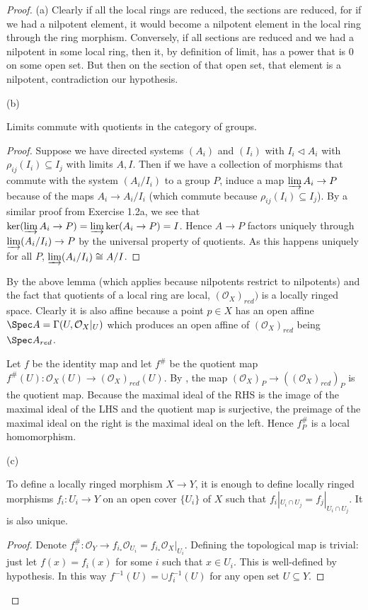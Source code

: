 \begin{proof}
	(a) Clearly if all the local rings are reduced, the sections are reduced, for if we had a nilpotent element, it would become a nilpotent element in the local ring through the ring morphism.
	Conversely, if all sections are reduced and we had a nilpotent in some local ring, then it, by definition of limit, has a power that is $0$ on some open set.
	But then on the section of that open set, that element is a nilpotent, contradiction our hypothesis.

	(b)
	\begin{lem}\label{lem:limquotient}
		Limits commute with quotients in the category of groups.
	\end{lem}
	\begin{proof}
		Suppose we have directed systems $(A_i) $ and $(I_i) $ with $I_i \triangleleft A_i$ with $\rho_{ij}(I_i) \subseteq I_j $ with limits $A, I $.
		Then if we have a collection of morphisms that commute with the system $(A_i / I_i)$ to a group $P $, induce a map $\varinjlim A_i \to P $ because of the maps $A_i \to A_i / I_i $ (which commute because $\rho_{ij}(I_i) \subseteq I_j $).
		By a similar proof from Exercise 1.2a, we see that $\ker(\varinjlim A_i \to P) = \varinjlim \ker (A_i \to P) = I$.
		Hence $A \to P $ factors uniquely through $\varinjlim (A_i /I_i) \to P $ by the universal property of quotients.
		As this happens uniquely for all $P $, $\varinjlim (A_i /I_i) \cong A / I $.
	\end{proof}

	By the above lemma (which applies because nilpotents restrict to nilpotents) and the fact that quotients of a local ring are local, $(\mathcal{O}_X)_{red}) $ is a locally ringed space.
	Clearly it is also affine because a point $p \in X $ has an open affine $\Spec A = \Gamma(U, \mathcal{O}_X|_U)$ which produces an open affine of $(\mathcal{O}_X)_{red} $ being $\Spec A_{red} $.

	Let $f $ be the identity map and let $f^\# $ be the quotient map $f^\#(U): \mathcal{O}_X(U) \to (\mathcal{O}_X)_{red}(U) $.
	By , the map $(\mathcal{O}_X)_P \to ((\mathcal{O}_X)_{red})_P$ is the quotient map.
	Because the maximal ideal of the RHS is the image of the maximal ideal of the LHS and the quotient map is surjective, the preimage of the maximal ideal on the right is the maximal ideal on the left.
	Hence $f^\#_P $ is a local homomorphism.

	(c)
	\begin{lem}\label{lem:constsheafmorphism}
		To define a locally ringed morphism $X\to Y $, it is enough to define locally ringed morphisms $f_i: U_i \to Y$ on an open cover $\{U_i\}   $ of $X $ such that $f_i|_{U_i\cap U_j} = f_j|_{U_i\cap U_j}$.
		It is also unique.
	\end{lem}
	\begin{proof}
		Denote $f_i^\#: \mathcal{O}_Y \to f_{i_\ast} \mathcal{O}_{U_i} = f_{i_\ast} \mathcal{O}_X|_{U_i} $.
		Defining the topological map is trivial: just let $f(x) = f_i(x) $ for some $i $ such that $x\in U_i $.
		This is well-defined by hypothesis.
		In this way $f^{-1}(U) = \cup f_i^{-1}(U) $ for any open set $U \subseteq Y $.


\end{proof}
\end{proof}

